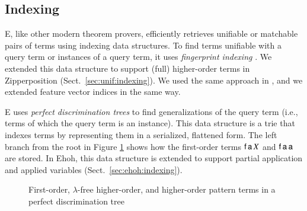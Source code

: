 \subsection{Indexing} E, like other modern theorem provers, efficiently retrieves
unifiable or matchable pairs of terms using indexing data structures. To find
terms unifiable with a query term or instances of a query term, it uses
\emph{fingerprint indexing} \cite{ss-12-fp-indexing}. We extended this data
structure to support (full) higher-order terms in Zipperposition (Sect.~\ref{sec:unif:indexing}). 
We used the same approach in \ehohii{},
and we extended feature vector indices \cite{ss-2013-feature-vector}
in the same way.

E uses \emph{perfect discrimination trees} \cite{mcc-92-pdts} to find
generalizations of the query term (i.e., terms of which the query term is an instance).
This data structure is a trie
that indexes terms by representing them in a serialized, flattened form.
The left branch from the root in Figure \ref{fig:pdt} shows how the first-order terms
$\mathsf{f}\, \mathsf{a} \, X$ and $\mathsf{f}\, \mathsf{a} \, \mathsf{a}$ are stored.
In Ehoh, this data structure is extended to support partial application
and applied variables (Sect.~\ref{sec:ehoh:indexing}).

\begin{figure}[tb]
\centering
{}
\caption{First-order, $\lambda$-free higher-order, and higher-order pattern
  terms in a perfect discrimination tree}
\label{fig:pdt}
\end{figure}

